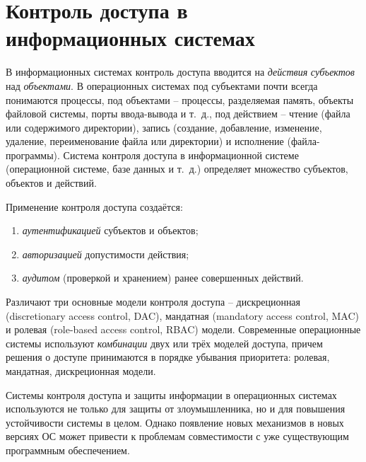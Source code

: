 \section[Контроль доступа в информационных системах]{Контроль доступа в \protect\\ информационных системах}


В информационных системах контроль доступа вводится на \emph{действия} \emph{субъектов} над \emph{объектами}. В операционных системах под субъектами почти всегда понимаются процессы, под объектами -- процессы, разделяемая память, объекты файловой системы, порты ввода-вывода и т.~д., под действием -- чтение (файла или содержимого директории), запись (создание, добавление, изменение, удаление, переименование файла или директории) и исполнение (файла-программы). Система контроля доступа в информационной системе (операционной системе, базе данных и т.~д.) определяет множество субъектов, объектов и действий.

Применение контроля доступа создаётся:

\begin{enumerate}
	\item \emph{аутентификацией} субъектов и объектов;
	\item \emph{авторизацией} допустимости действия;
	\item \emph{аудитом} (проверкой и хранением) ранее совершенных действий.
\end{enumerate}

Различают три основные модели контроля доступа -- дискреционная (discretionary access control, DAC), мандатная (mandatory access control, MAC) и ролевая (role-based access control, RBAC) модели. Современные операционные системы используют \emph{комбинации} двух или трёх моделей доступа, причем решения о доступе принимаются в порядке убывания приоритета: ролевая, мандатная, дискреционная модели.

Системы контроля доступа и защиты информации в операционных системах используются не только для защиты от злоумышленника, но и для повышения устойчивости системы в целом. Однако появление новых механизмов в новых версиях ОС может привести к проблемам совместимости с уже существующим программным обеспечением.

